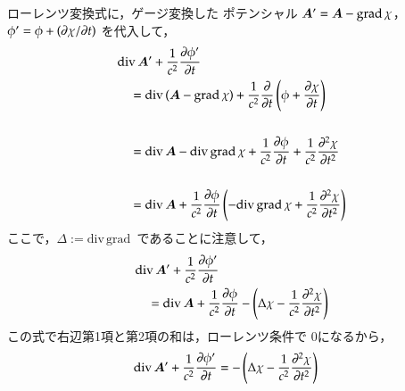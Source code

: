             ローレンツ変換式に，ゲージ変換した
            ポテンシャル $\boldsymbol{A}'=\boldsymbol{A}-\mathrm{grad}\,\chi$，
            $\phi ' =\phi +\left(\partial \chi/\partial t\right)$ を代入して，
                            \begin{align*}
                                &\mathrm{div\,}\boldsymbol{A}' + \frac{1}{c^{2}}\frac{\partial \phi '}{\partial t} \notag \\
                                &\quad=\mathrm{div\,}(\boldsymbol{A}-\mathrm{grad}\,\chi)
                                +\frac{1}{c^{2}}\frac{\partial}{\partial t}
                                \left(\phi +\frac{\partial \chi}{\partial t}\right) \\ \notag \\
                                &\quad=\mathrm{div\,}\boldsymbol{A}
                                -\mathrm{div\,grad\,}\chi
                                +\frac{1}{c^{2}}\frac{\partial \phi}{\partial t}
                                +\frac{1}{c^{2}}\frac{\partial^{2} \chi}{\partial t^{2}} \\ \notag \\
                                &\quad=\mathrm{div\,}\boldsymbol{A}
                                +\frac{1}{c^{2}}\frac{\partial \phi}{\partial t}
                                \left(
                                    -\mathrm{div\,grad\,}\chi
                                +\frac{1}{c^{2}}\frac{\partial^{2} \chi}{\partial t^{2}}
                                \right)
                            \end{align*}
            ここで，$\Delta:=\mathrm{div\,grad\,}$ であることに注意して，
                            \begin{align*}
                                &\mathrm{div\,}\boldsymbol{A}'
                                +\frac{1}{c^{2}}\frac{\partial \phi '}{\partial t} \\
                                &\quad=
                                \mathrm{div\,}\boldsymbol{A}
                                +\frac{1}{c^{2}}\frac{\partial \phi}{\partial t}
                                -\left(
                                    \Delta\chi
                                -\frac{1}{c^{2}}\frac{\partial^{2} \chi}{\partial t^{2}}
                                \right)
                            \end{align*}
            この式で右辺第1項と第2項の和は，ローレンツ条件で 0になるから，
                            \begin{align*}
                                \mathrm{div\,}\boldsymbol{A}'
                                +\frac{1}{c^{2}}\frac{\partial \phi '}{\partial t}
                                &=
                                -\left(
                                    \Delta\chi
                                -\frac{1}{c^{2}}\frac{\partial^{2} \chi}{\partial t^{2}}
                                \right)
                            \end{align*}
